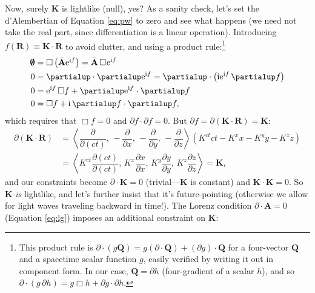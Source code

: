 \documentclass[12pt]{article}
\renewcommand{\vv}[1]{\mathbf{#1}}
\begin{document}
Now, surely $\vv K$ is lightlike (null), yes? As a sanity check, let's set the d'Alembertian of Equation \ref{eq:pw} to zero and see what happens (we need not take the real part, since differentiation is a linear operation). Introducing $f(\vv R) \equiv \vv K \cdot \vv R$ to avoid clutter, and using a product rule:\footnote{This product rule is $\partialup \cdot (g \vv Q) = g (\partialup \cdot \vv Q) + (\partialup g) \cdot \vv Q$ for a four-vector $\vv Q$ and a spacetime scalar function $g$, easily verified by writing it out in component form. In our case, $\vv Q = \partialup h$ (four-gradient of a scalar $h$), and so $\partialup \cdot (g \, \partialup h) = g \Box h + \partialup g \cdot \partialup h$.}
\begin{equation*}
\begin{aligned}
\textrm{\mbox{\boldmath $\emptyset$}} &= \Box \left( \bar{\vv A} \mathrm{e}^{\mathrm{i} f} \right) = \bar{\vv A} \, \Box \mkern1mu \mathrm{e}^{\mathrm{i} f} \\
0 &= \partialup \cdot \partialup \mathrm{e}^{\mathrm{i} f} = \partialup \cdot \left( \mathrm{i} \mathrm{e}^{\mathrm{i} f} \, \partialup f \right) \\
0 &= \mathrm{e}^{\mathrm{i} f} \, \Box f + \partialup \mathrm{e}^{\mathrm{i} f} \cdot \partialup f  \\
0 &=  \Box f + \mathrm{i} \, \partialup f \cdot \partialup f ,
\end{aligned}
\end{equation*}
which requires that $\Box f = 0$ and $\partialup f \cdot \partialup f = 0$. But $\partialup f = \partialup (\vv K \cdot \vv R) = \vv K$:
\begin{equation*}
\begin{aligned}
\partialup (\vv K \cdot \vv R) &= \left \langle \dfrac{\partial}{\partial (ct)}, \, - \dfrac{\partial}{\partial x}, \, - \dfrac{\partial}{\partial y}, \, - \dfrac{\partial}{\partial z} \right \rangle \left( K^{ct} ct - K^x x - K^y y - K^z z \right) \\[3pt]
&= \left \langle K^{ct} \dfrac{\partial (ct)}{\partial (ct)}, \, K^x \dfrac{\partial x}{\partial x}, \, K^y \dfrac{\partial y}{\partial y} , \, K^z \dfrac{\partial z}{\partial z} \right \rangle = \vv K ,
\end{aligned}
\end{equation*}
and our constraints become $\partialup \cdot \vv K = 0$ (trivial---$\vv K$ is constant) and $\vv K \cdot \vv K = 0$. So $\vv K$ \emph{is} lightlike, and let's further insist that it's future-pointing (otherwise we allow for light waves traveling backward in time!). The Lorenz condition $\partialup \cdot \vv A = 0$ (Equation \ref{eq:lg}) imposes an additional constraint on $\vv K$:
\end{document}
